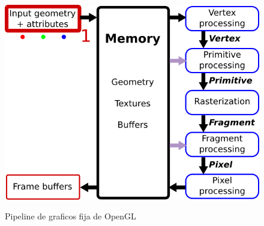 \begin{figure}
    \centering
    \includegraphics[width=\textwidth]{imagenes/Pipeline_Fija.png}
    \caption{Pipeline de graficos fija de OpenGL}
    \cite{freeSI03graphicsPipeline}
\end{figure}

